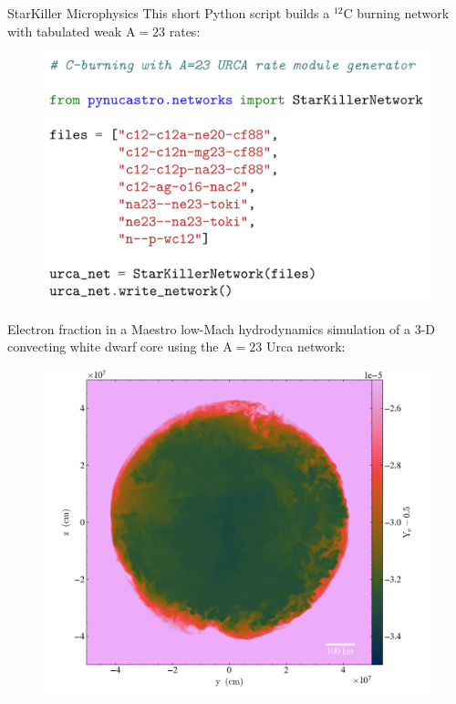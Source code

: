 \documentclass[final]{beamer}
\newlength{\onecolwid}
\newlength{\twocolwid}
\newcommand{\isot}[2]{$^{#2}\mathrm{#1}$}
\begin{document}
\begin{frame}[t]
\begin{columns}[t]
\begin{column}{\twocolwid}
\begin{columns}[t,totalwidth=\twocolwid]
\begin{column}{\onecolwid}
\begin{block}{StarKiller Microphysics}
This short Python script builds a \isot{C}{12} burning network with tabulated weak $\mathrm{A=23}$ rates:

\begin{figure}
\includegraphics[width=0.8\linewidth]{figures/starkiller-network/starkiller-urca-network.png}
\end{figure}

Electron fraction in a Maestro low-Mach hydrodynamics simulation of a
3-D convecting white dwarf core using the $\mathrm{A=23}$ Urca network:

\begin{figure}
\includegraphics[width=\linewidth]{figures/starkiller-network/wd_4lev_Tc5-5e8_rhoc4-5e9_plt06605_slice_x_electron_fraction_asymmetry.png}
\end{figure}


\end{block}
\end{column}
\end{columns}
\end{column}
\end{columns}
\end{frame}
\end{document}

